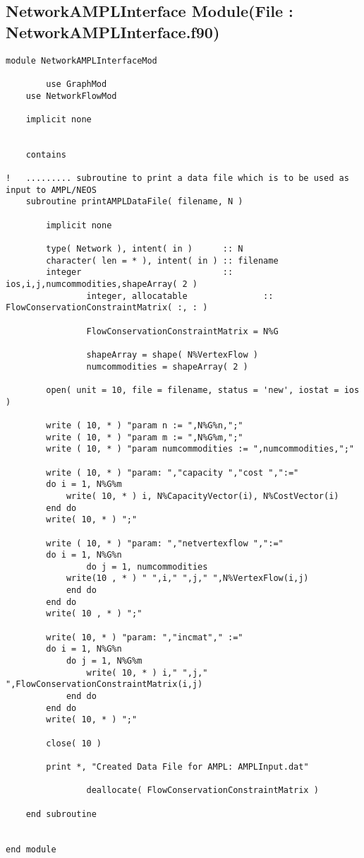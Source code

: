 \documentclass[10pt,a4paper,margin = 1.25cm]{article}
\begin{document}
\subsection*{NetworkAMPLInterface Module(File : NetworkAMPLInterface.f90) }
\begin{lstlisting}
module NetworkAMPLInterfaceMod
		
		use GraphMod
    use NetworkFlowMod
    
    implicit none
    
    
    contains
    
!   ......... subroutine to print a data file which is to be used as input to AMPL/NEOS    
    subroutine printAMPLDataFile( filename, N )
        
        implicit none
        
        type( Network ), intent( in )      :: N
        character( len = * ), intent( in ) :: filename
        integer                            :: ios,i,j,numcommodities,shapeArray( 2 )
				integer, allocatable               :: FlowConservationConstraintMatrix( :, : )
				
				FlowConservationConstraintMatrix = N%G
				
				shapeArray = shape( N%VertexFlow )
				numcommodities = shapeArray( 2 )
				
        open( unit = 10, file = filename, status = 'new', iostat = ios )

        write ( 10, * ) "param n := ",N%G%n,";"
        write ( 10, * ) "param m := ",N%G%m,";"
        write ( 10, * ) "param numcommodities := ",numcommodities,";"
        
        write ( 10, * ) "param: ","capacity ","cost ",":="
        do i = 1, N%G%m
            write( 10, * ) i, N%CapacityVector(i), N%CostVector(i)
        end do
        write( 10, * ) ";"
        
        write ( 10, * ) "param: ","netvertexflow ",":="
        do i = 1, N%G%n
        		do j = 1, numcommodities
            write(10 , * ) " ",i," ",j," ",N%VertexFlow(i,j)
            end do
        end do
        write( 10 , * ) ";"

        write( 10, * ) "param: ","incmat"," :=" 
        do i = 1, N%G%n
            do j = 1, N%G%m
                write( 10, * ) i," ",j," ",FlowConservationConstraintMatrix(i,j)
            end do
        end do
        write( 10, * ) ";"

        close( 10 )

        print *, "Created Data File for AMPL: AMPLInput.dat"
				
				deallocate( FlowConservationConstraintMatrix )
				
    end subroutine
    
    
end module
\end{lstlisting}
\end{document}
